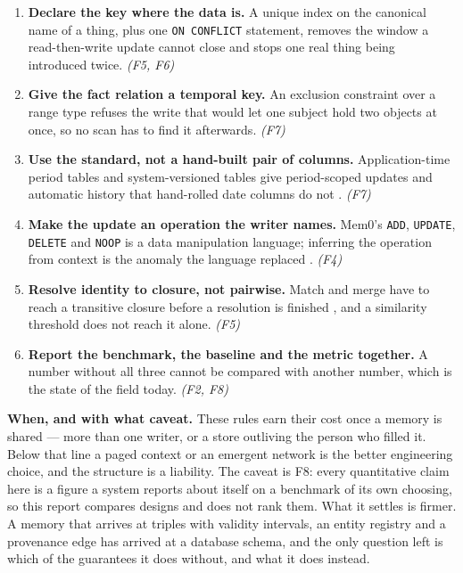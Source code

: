 \documentclass[11pt,a4paper]{article}
\newcommand{\code}[1]{\texttt{\small #1}}
\begin{document}
\begin{enumerate}
  \item \textbf{Declare the key where the data is.} A unique index on the
        canonical name of a thing, plus one \code{ON CONFLICT} statement,
        removes the window a read-then-write update cannot close and
        stops one real thing being introduced twice. \emph{(F5, F6)}
  \item \textbf{Give the fact relation a temporal key.} An exclusion
        constraint over a range type refuses the write that would let one
        subject hold two objects at once, so no scan has to find it
        afterwards. \emph{(F7)}
  \item \textbf{Use the standard, not a hand-built pair of columns.}
        Application-time period tables and system-versioned tables give
        period-scoped updates and automatic history that hand-rolled
        date columns do not \cite{sql2011}. \emph{(F7)}
  \item \textbf{Make the update an operation the writer names.} Mem0's
        \code{ADD}, \code{UPDATE}, \code{DELETE} and \code{NOOP} is a data
        manipulation language; inferring the operation from context is
        the anomaly the language replaced \cite{mem0}. \emph{(F4)}
  \item \textbf{Resolve identity to closure, not pairwise.} Match and
        merge have to reach a transitive closure before a resolution is
        finished \cite{swoosh}, and a similarity threshold does not reach
        it alone. \emph{(F5)}
  \item \textbf{Report the benchmark, the baseline and the metric
        together.} A number without all three cannot be compared with
        another number, which is the state of the field today.
        \emph{(F2, F8)}
\end{enumerate}

\textbf{When, and with what caveat.} These rules earn their cost once a
memory is shared --- more than one writer, or a store outliving the
person who filled it. Below that line a paged context or an emergent
network is the better engineering choice, and the structure is a
liability. The caveat is F8: every quantitative claim here is a figure a
system reports about itself on a benchmark of its own choosing, so this
report compares designs and does not rank them. What it settles is
firmer. A memory that arrives at triples with validity intervals, an
entity registry and a provenance edge has arrived at a database schema,
and the only question left is which of the guarantees it does without,
and what it does instead.
\end{document}
